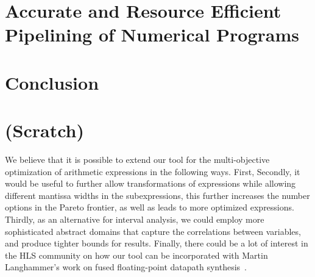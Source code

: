 









\chapter{Accurate and Resource Efficient Pipelining of Numerical Programs}














\chapter{Conclusion}

\chapter{(Scratch)}

We believe that it is possible to extend our tool for the multi-objective
optimization of arithmetic expressions in the following ways. First, Secondly,
it would be useful to further allow transformations of expressions while
allowing different mantissa widths in the subexpressions, this further
increases the number options in the Pareto frontier, as well as leads to more
optimized expressions. Thirdly, as an alternative for interval analysis, we
could employ more sophisticated abstract domains that capture the correlations
between variables, and produce tighter bounds for results. Finally, there
could be a lot of interest in the HLS community on how our tool can be
incorporated with Martin Langhammer's work on fused floating-point datapath
synthesis~\cite{langhammer}.

